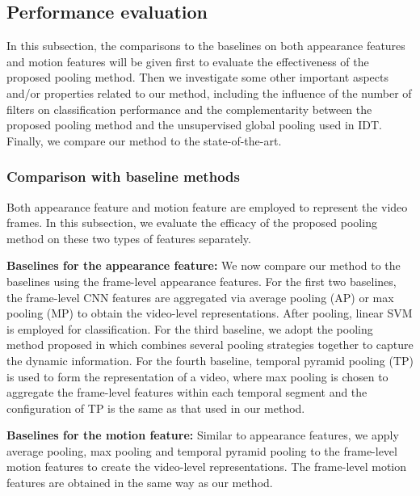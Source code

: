 \documentclass[journal]{IEEEtran}
\begin{document}
\subsection{Performance evaluation}
In this subsection, the comparisons to the baselines on both appearance features and motion features will be given first to evaluate the effectiveness of the proposed pooling method. Then we investigate some other important aspects and/or properties related to our method, including the influence of the number of filters on classification performance and the complementarity between the proposed pooling method and the unsupervised global pooling used in IDT. Finally, we compare our method to the state-of-the-art.

\subsubsection{Comparison with baseline methods}
Both appearance feature and motion feature are employed to represent the video frames. In this subsection, we evaluate the efficacy of the proposed pooling method on these two types of features separately.
%
%

\noindent \textbf{Baselines for the appearance feature:} We now compare our method to the baselines using the frame-level appearance features. For the first two baselines, the frame-level CNN features are aggregated via average pooling (AP) or max pooling (MP) to obtain the video-level representations. After pooling, linear SVM \cite{REF08a} is employed for classification. For the third baseline, we adopt the pooling method proposed in \cite{Ryoo_2015_CVPR} which combines several pooling strategies together to capture the dynamic information. For the fourth baseline, temporal pyramid pooling (TP) is used to form the representation of a video, where max pooling is chosen to aggregate the frame-level features within each temporal segment and the configuration of TP is the same as that used in our method.

\noindent \textbf{Baselines for the motion feature:} Similar to appearance features, we apply average pooling, max pooling and temporal pyramid pooling to the frame-level motion features to create the video-level representations. The frame-level motion features are obtained in the same way as our method.
\end{document}
